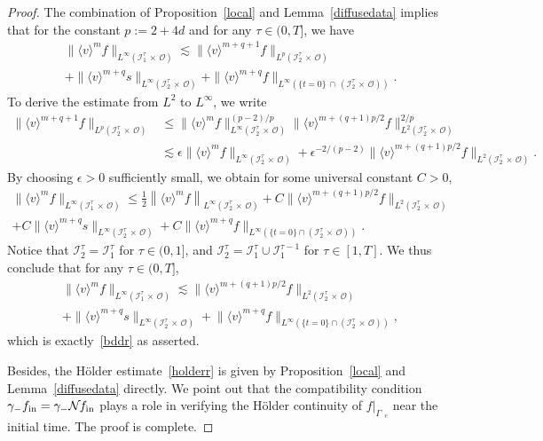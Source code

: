 \documentclass[AHL,Unicode,longabstracts,published]{cedram}
\newcommand*\fin {f_{\rm in}}
\newcommand*\I {\mathcal{I}}
\newcommand*\NN {{\mathcal{N}\hspace{-.3mm}}}
\newcommand*\Ge {\Gamma_{\;\!\!\;\!\!e}}
\newcommand*\OO {\mathcal{O}}
\newcommand{\lv}{\langle v\rangle}
\begin{document}
\begin{proof}
The combination of Proposition~\ref{local} and Lemma~\ref{diffusedata} implies that for the constant $p:=2+4d$ and for any $\tau\in(0,T]$, we have
\begin{multline*}
\big\|\lv^{m}f\big\|_{L^\infty\left(\I_1^\tau\,\times\,\OO\right)}
\lesssim \big\|\lv^{m+q+1} f\big\|_{L^p\left(\I_2^\tau\,\times\,\OO\right)}\\
+ \|\lv^{m+q}s\|_{L^\infty\left(\I_2^\tau\,\times\,\OO\right)} + \|\lv^{m+q}f\|_{L^\infty\left(\{t=0\}\,\cap\,\left(\I_2^\tau\,\times\,\OO\right)\right)}.
\end{multline*}
To derive the estimate from $L^2$ to $L^\infty$, we write
\begin{align*}
\big\|\lv^{m+q+1} f\big\|_{L^p\left(\I_2^\tau\,\times\,\OO\right)}
&\le \big\|\lv^{m}f\big\|_{L^\infty\left(\I_2^\tau\,\times\,\OO\right)}^{(p-2)/p}
\big\|\lv^{m+(q+1)p/2}f\big\|_{L^2\left(\I_2^\tau\,\times\,\OO\right)}^{2/p} \\
&\lesssim \epsilon\|\lv^mf\|_{L^\infty\left(\I_2^\tau\,\times\,\OO\right)} + \epsilon^{-2/(p-2)} \big\|\lv^{m+(q+1)p/2}f\big\|_{L^2\left(\I_2^\tau\,\times\,\OO\right)}.
\end{align*}
By choosing $\epsilon>0$ sufficiently small, we obtain for some universal constant $C>0$,
\begin{multline*}
\big\|\lv^mf\big\|_{L^\infty\left(\I_1^\tau\,\times\,\OO\right)}
\le \frac{1}{2}\left\|\lv^mf\right\|_{L^\infty\left(\I_2^\tau\,\times\,\OO\right)} + C\big\|\lv^{m+(q+1)p/2}f\big\|_{L^2\left(\I_2^\tau\,\times\,\OO\right)}\\
+ C\big\|\lv^{m+q}s\big\|_{L^\infty\left(\I_2^\tau\,\times\,\OO\right)} + C\big\|\lv^{m+q}f\big\|_{L^\infty\left(\{t=0\}\cap\left(\I_2^\tau\,\times\,\OO\right)\right)} .
\end{multline*}
Notice that $\I_2^\tau=\I_1^\tau$ for $\tau\in(0,1]$, and $\I_2^\tau=\I_1^\tau\cup\I_1^{\tau-1}$ for $\tau\in[1,T]$. We thus conclude that for any $\tau\in(0,T]$,
\begin{multline*}
\big\|\lv^mf\big\|_{L^\infty\left(\I_1^\tau\,\times\,\OO\right)}
\lesssim \big\|\lv^{m+(q+1)p/2}f\big\|_{L^2\left(\I_2^\tau\,\times\,\OO\right)}\\ 
+ \big\|\lv^{m+q}s\big\|_{L^\infty\left(\I_2^\tau\,\times\,\OO\right)} + \big\|\lv^{m+q}f\big\|_{L^\infty\left(\{t=0\}\cap\left(\I_2^\tau\,\times\,\OO\right)\right)},
\end{multline*}
which is exactly~\eqref{bddr} as asserted.

Besides, the H\"older estimate~\eqref{holderr} is given by Proposition~\ref{local} and Lemma~\ref{diffusedata} directly. We point out that the compatibility condition $\gamma_-\fin=\gamma_-\NN\fin$ plays a role in verifying the H\"older continuity of $f|_{\Ge}$ near the initial time. The proof is complete.
\end{proof}
\end{document}
